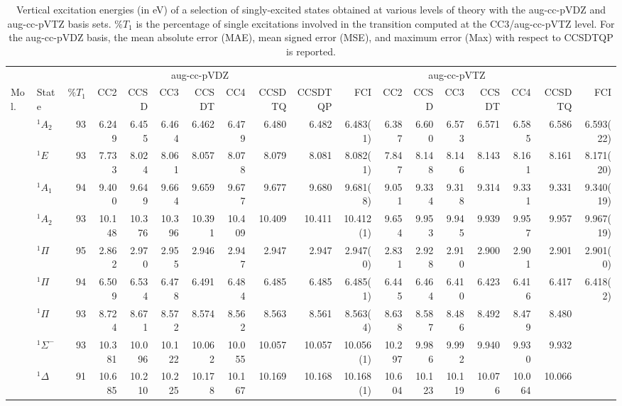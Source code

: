 \documentclass[aip,jcp,reprint,noshowkeys,superscriptaddress]{revtex4-1}
\newcommand{\mc}{\multicolumn}
\begin{document}
\begin{squeezetable}
\begin{table}
	\caption{Vertical excitation energies (in eV) of a selection of singly-excited states obtained at various levels of theory with the aug-cc-pVDZ and aug-cc-pVTZ basis sets. 
	$\%T_1$ is the percentage of single excitations involved in the transition computed at the CC3/aug-cc-pVTZ level.
	For the aug-cc-pVDZ basis, the mean absolute error (MAE), mean signed error (MSE), and maximum error (Max) with respect to CCSDTQP is reported.
	\label{tab:singles}}
	\begin{ruledtabular}
	\begin{tabular}{llrrrrrrrrrrrrrrrr}
				&		&	\mc{8}{c}{aug-cc-pVDZ}		&		\mc{7}{c}{aug-cc-pVTZ}		\\	
				\cline{4-11} \cline{12-18}
	Mol.	&	State	& $\%T_1$	&CC2	&CCSD	&CC3	&CCSDT	&CC4	&CCSDTQ	&CCSDTQP	&FCI	
									&CC2	&CCSD	&CC3	&CCSDT	&CC4	&CCSDTQ	&FCI			\\
	\hline
	\ce{NH3}	&	$^1A_2$ 		&93	&6.249	&6.455	&6.464	&6.462	&6.479	&6.480	&6.482	&6.483(1)	&6.387	&6.600	&6.573	&6.571	&6.585	&6.586	&6.593(22)	\\	
				&	$^1E$			&93	&7.733	&8.024	&8.061	&8.057	&8.078	&8.079	&8.081	&8.082(1)	&7.847	&8.148	&8.146	&8.143	&8.161	&8.161	&8.171(20)	\\	
				&	$^1A_1$ 		&94	&9.400	&9.649	&9.664	&9.659	&9.677	&9.677	&9.680	&9.681(8)	&9.051	&9.334	&9.318	&9.314	&9.331	&9.331	&9.340(19)	\\
				&	$^1A_2$ 		&93	&10.148	&10.376	&10.396	&10.391	&10.409	&10.409	&10.411	&10.412(1)	&9.654	&9.953	&9.945	&9.939	&9.957	&9.957	&9.967(19)	\\
	\ce{BH}		&	$^1\Pi$ 		&95	&2.862	&2.970	&2.955	&2.946	&2.947	&2.947	&2.947	&2.947(0)	&2.831	&2.928	&2.910	&2.900	&2.901	&2.901	&2.901(0)	\\
	\ce{BF}		&	$^1\Pi$ 		&94	&6.509	&6.534	&6.478	&6.491	&6.484	&6.485	&6.485	&6.485(1)	&6.445	&6.464	&6.410	&6.423	&6.416	&6.417	&6.418(2)\\
	\ce{CO}		&	$^1\Pi$ 		&93	&8.724	&8.671	&8.572	&8.574	&8.562	&8.563	&8.561	&8.563(4)	&8.638	&8.587	&8.486	&8.492	&8.479	&8.480	&	\\
				&	$^1\Sigma^-$ 	&93	&10.381	&10.096	&10.122	&10.062	&10.055	&10.057	&10.057	&10.056(1)	&10.297	&9.986	&9.992	&9.940	&9.930	&9.932	&	\\
				&	$^1\Delta$ 		&91	&10.685	&10.210	&10.225	&10.178	&10.167	&10.169	&10.168	&10.168(1)	&10.604	&10.123	&10.119	&10.076	&10.064	&10.066	&	\\

\end{tabular}
\end{ruledtabular}
\end{table}
\end{squeezetable}
\end{document}
